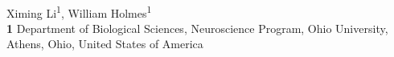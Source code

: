 \documentclass[10pt,letterpaper]{article}
\date{}
\begin{document}
\vspace*{0.2in}

\begin{flushleft}
{\Large
\textbf{} %
}
\newline
\\
Ximing Li\textsuperscript{1},
William Holmes\textsuperscript{1}
\\
\bigskip
\textbf{1} Department of Biological Sciences, Neuroscience Program, Ohio University, Athens, Ohio, United States of America
\\
\bigskip

% 
%



\end{flushleft}
\end{document}
